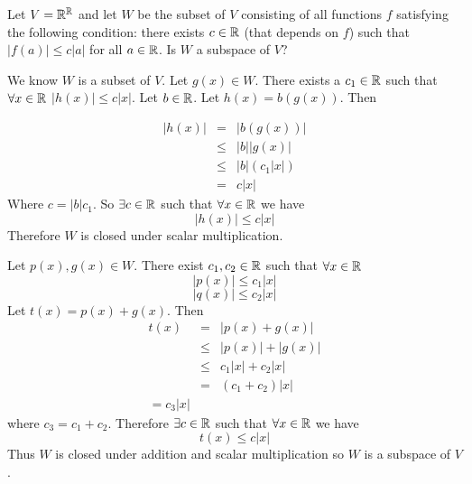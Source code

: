 \begin{problem}[Golan 85]
Let $V = \mathbb{R}^{\mathbb{R}}$ and let $W$ be the subset of $V$ consisting of all
functions $f$ satisfying the following condition: there exists $c\in \mathbb{R}$
(that depends on $f$) such that $|f(a)|\leq c|a|$ for all $a\in \mathbb{R}$.
Is $W$ a subspace of $V$?

\end{problem}
\smallskip
\begin{solution}

We know $W$ is a subset of $V$. Let $g(x) \in W$. There exists a $c_1 \in \mathbb{R}$ such that $\forall x \in \mathbb{R}$  $|h(x)| \leq c|x|$.
Let $b \in \mathbb{R}$. Let $h(x) = b(g(x))$. Then

\begin{eqnarray*}
|h(x)| & = & |b(g(x))| \\
	   & \leq & |b| |g(x)| \\
	   & \leq & |b|(c_1|x|) \\
	   & = & c|x|
\end{eqnarray*}
Where $c = |b|c_1$. So $\exists c \in \mathbb{R}$ such that $\forall x \in \mathbb{R}$ we have
$$|h(x)| \leq c|x|$$
Therefore $W$ is closed under scalar multiplication.  

Let $p(x),g(x) \in W$.  There exist $c_1,c_2 \in \mathbb{R}$ such that $\forall x \in \mathbb{R}$
$$|p(x)| \leq c_1|x|$$
$$|q(x)| \leq c_2|x|$$
Let $t(x) = p(x) + g(x)$. Then
\begin{eqnarray*}
t(x) & = & |p(x) + g(x)| \\ 
	 & \leq & |p(x)| + |g(x)| \\
	 & \leq & c_1|x| + c_2|x| \\
	 & = & (c_1+c_2)|x| \\
	 = c_3|x|  
\end{eqnarray*}
where $c_3 = c_1 + c_2$. Therefore $\exists c \in \mathbb{R}$ such that $\forall x \in \mathbb{R}$ we have
$$t(x) \leq c|x|$$
Thus $W$ is closed under addition and scalar multiplication so $W$ is a subspace of $V$.
\end{solution}
\probskip



